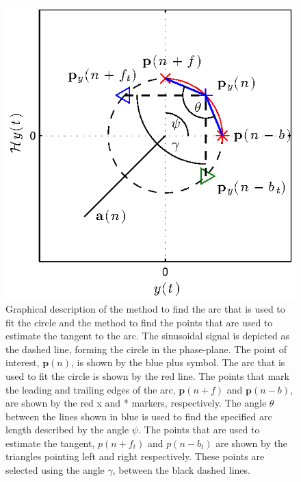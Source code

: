 \documentclass[a4paper]{IEEEtran}
\begin{document}
\begin{figure}[ht]
	\centering
		\includegraphics[scale=1]{./Figures/eps/SetArcLengthDemo.eps}
	\caption{Graphical description of the method to find the arc that is used to fit the circle and the method to find the points that are used to estimate the tangent to the arc. The sinusoidal signal is depicted as the dashed line, forming the circle in the phase-plane. The point of interest, $\mathbf{p}(n)$, is shown by the blue plus symbol. The arc that is used to fit the circle is shown by the red line. The points that mark the leading and trailing edges of the arc, $\mathbf{p}(n+f)$ and $\mathbf{p}(n-b)$, are shown by the red x and * markers, respectively. The angle $\theta$ between the lines shown in blue is used to find the specified arc length described by the angle $\psi$. The points that are used to estimate the tangent, $p(n+f_t)$ and $p(n-b_t)$ are shown by the triangles pointing left and right respectively. These points are selected using the angle $\gamma$, between the black dashed lines.}
	\label{fig:SetArcLengthDemo}
\end{figure}
\end{document}
